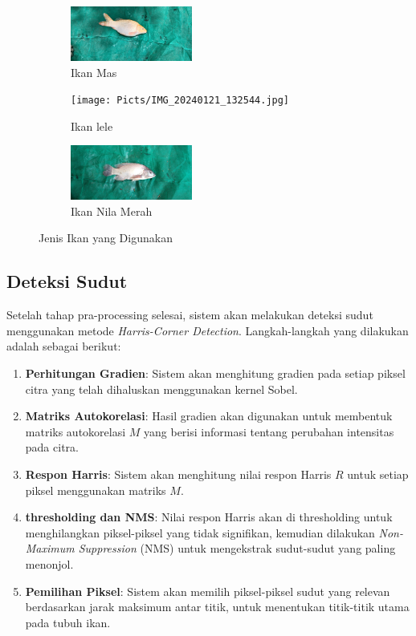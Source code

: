 \begin{figure}
	\centering
	\begin{subfigure}{.3\textwidth}
		\centering
        \includegraphics [keepaspectratio, width=4cm]{Picts/IMG_20240121_131125.jpg}
		\caption{Ikan Mas}
	\end{subfigure}
	\begin{subfigure}{.3\textwidth}
		\centering
		\texttt{[image: Picts/IMG\_20240121\_132544.jpg]}
		\caption{Ikan lele}
	\end{subfigure} 
	\begin{subfigure}{.3\textwidth}
		\centering
		\includegraphics [keepaspectratio, width=4cm]{Picts/IMG_20240121_140044.jpg}
		\caption{Ikan Nila Merah}
	\end{subfigure}
	\caption{Jenis Ikan yang Digunakan}
    \label{fig:dataset}
\end{figure}


\subsection{Deteksi Sudut}
    Setelah tahap pra-processing selesai, sistem akan melakukan deteksi sudut menggunakan metode \emph{Harris-Corner Detection}. Langkah-langkah yang dilakukan adalah sebagai berikut: 
    \begin{enumerate}
            \item \textbf{Perhitungan Gradien}: Sistem akan menghitung gradien pada setiap piksel citra yang telah dihaluskan menggunakan kernel Sobel.
            \item \textbf{Matriks Autokorelasi}: Hasil gradien akan digunakan untuk membentuk matriks autokorelasi \(M\) yang berisi informasi tentang perubahan intensitas pada citra.
            \item \textbf{Respon Harris}: Sistem akan menghitung nilai respon Harris \(R\) untuk setiap piksel menggunakan matriks \(M\).
            \item \textbf{thresholding dan NMS}: Nilai respon Harris akan di thresholding untuk menghilangkan piksel-piksel yang tidak signifikan, kemudian dilakukan \emph{Non-Maximum Suppression} (NMS) untuk mengekstrak sudut-sudut yang paling menonjol.
            \item \textbf{Pemilihan Piksel}: Sistem akan memilih piksel-piksel sudut yang relevan berdasarkan jarak maksimum antar titik, untuk menentukan titik-titik utama pada tubuh ikan.
        \end{enumerate}

